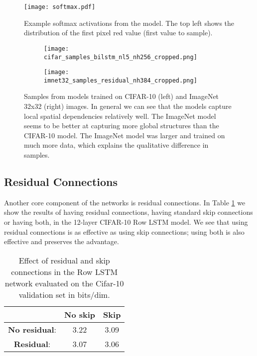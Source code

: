 \documentclass{article}
\begin{document}
\begin{figure}[h]
  \centering
  \texttt{[image: softmax.pdf]}
  \vspace{-0.5cm}
  \caption{Example softmax activations from the model. The top left shows the distribution of the first pixel red value (first value to sample).}
  \label{fig:softmax_activations}
\end{figure}

\begin{figure*}[ht]
\begin{subfigure}{.5\textwidth}
  \centering
  \texttt{[image: cifar\_samples\_bilstm\_nl5\_nh256\_cropped.png]}
\end{subfigure}\hfill
\begin{subfigure}{.5\textwidth}
  \centering
  \texttt{[image: imnet32\_samples\_residual\_nh384\_cropped.png]}
\end{subfigure}\hfill
\caption{Samples from models trained on CIFAR-10 (left) and ImageNet 32x32 (right) images. In general we can see that the models capture local spatial dependencies relatively well. The ImageNet model seems to be better at capturing more global structures than the CIFAR-10 model. The ImageNet model was larger and trained on much more data, which explains the qualitative difference in samples.}
\label{fig:samples_32}
\end{figure*}

\subsection{Residual Connections}
Another core component of the networks is residual connections. In Table \ref{table:effect_skipconnections} we show the results of having residual connections, having standard skip connections or having both, in the 12-layer CIFAR-10 Row LSTM model. We see that using residual connections is as effective as using skip connections; using both is also effective and preserves the advantage. 

\begin{table}[h]
	\begin{center}
	\begin{tabular}{ccc}
		\toprule
		 & \textbf{No skip} & \textbf{Skip} \\ 
		\midrule
		\textbf{No residual}: & 3.22 & 3.09 \\ 
	    \textbf{Residual}: & 3.07 & 3.06 \\ 
	    \bottomrule
	\end{tabular}
	\end{center}
\vspace{-0.3cm}
\caption{Effect of residual and skip connections in the Row LSTM network evaluated on the Cifar-10 validation set in bits/dim.}
\label{table:effect_skipconnections}
\end{table}
\end{document}
